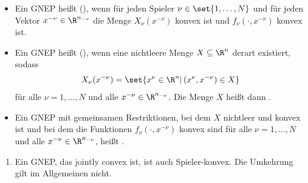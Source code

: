 \begin{definition*}
  \begin{itemize}
  \item Ein GNEP heißt  (), wenn für jeden Spieler $\nu \in \set{1, \dots, N}$ und für jeden Vektor $x^{-\nu} \in \R^{n_{-\nu}}$ die Menge $X_{\nu}(x^{-\nu})$ konvex ist und $f_{\nu}(\cdot, x^{-\nu})$ konvex ist. 
\item Ein GNEP heißt  (), wenn eine nichtleere Menge $X \subseteq \R^{n}$ derart existiert, sodass
  \begin{align*}
    X_{\nu} (x^{-\nu}) = \set{x^{\nu} \in \R^{n}|\, (x^{\nu}, x^{-\nu}) \in X}
  \end{align*}
für alle $\nu = 1, \dots, N$ und alle $x^{-\nu} \in \R^{n_{-\nu}}$. Die Menge $X$ heißt dann . 
\item Ein GNEP mit gemeinsamen Restriktionen, bei dem $X$ nichtleer und konvex ist und bei dem die Funktionen $f_{\nu}(\cdot, x^{-\nu})$ konvex sind für alle $\nu = 1, \dots, N$ und alle $x^{-\nu} \in \R^{n_{-\nu}}$, heißt . 
\end{itemize}
\end{definition*}
\begin{bemerkung*}
  \begin{enumerate}
  \item Ein GNEP, das jointly convex ist, ist auch Spieler-konvex. Die Umkehrung gilt im Allgemeinen nicht. 
  \end{enumerate}
\end{bemerkung*}


